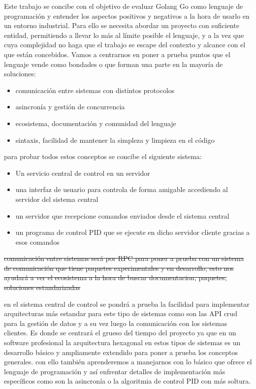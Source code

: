 
Este trabajo se concibe con el objetivo de evaluar Golang Go como lenguaje de programación y entender los aspectos positivos y negativos a la hora de usarlo en un entorno industrial. Para ello se necesita abordar un proyecto con suficiente entidad, permitiendo a llevar lo más al límite posible el lenguaje, y a la vez que cuya complejidad no haga que el trabajo se escape del contexto y alcance con el que están concebidos. Vamos a centrarnos en poner a prueba puntos que el lenguaje vende como bondades o que forman una parte en la mayoría de soluciones:

\begin{itemize}
	\item comunicación entre sistemas con distintos protocolos
	\item asincronía y gestión de concurrencia
	\item ecosistema, documentación y comunidad del lenguaje
	\item sintaxis, facilidad de mantener la simpleza y limpieza en el código
\end{itemize} 

para probar todos estos conceptos se concibe el siguiente sistema:

\begin{itemize}
	\item Un servicio central de control en un servidor
	\item una interfaz de usuario para controla de forma amigable accediendo al servidor del sistema central
	\item un servidor que recepcione comandos enviados desde el sistema central
	\item un programa de control PID que se ejecute en dicho servidor cliente gracias a esos comandos
\end{itemize}


\sout{comunicación entre sistemas será por RPC para poner a prueba con un sistema de comunicación que tiene paquetes experimentales y en desarrollo, esto nos ayudará a ver el ecosistema a la hora de buscar documentacion, paquetes, soluciones estandarizadas}


en el sistema central de control se pondrá a prueba la facilidad para implementar arquitecturas más estandar para este tipo de sistemas como son las API crud para la gestión de datos y a su vez luego la comunicación con los sistemas clientes. Es donde se centrará el grueso del tiempo del proyecto ya que en un software profesional la arquitectura hexagonal en estos tipos de sistemas es un desarrollo básico y ampliamente extendido para poner a prueba los conceptos generales. con ello también aprenderemos a manejarnos con lo básico que ofrece el lenguaje de programación y así enfrentar detalles de implementación más específicos como son la asincronía o la algoritmia de control PID con más soltura.


